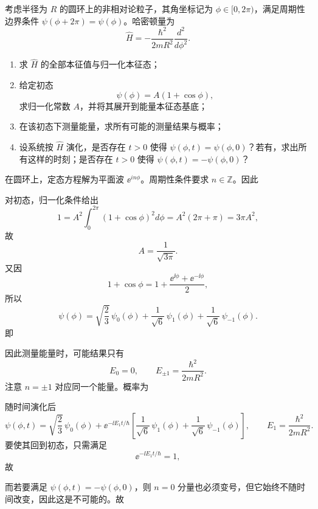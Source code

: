 ﻿

\begin{question}
考虑半径为 $R$ 的圆环上的非相对论粒子，其角坐标记为 $\phi\in[0,2\pi)$，满足周期性边界条件 $\psi(\phi+2\pi)=\psi(\phi)$。哈密顿量为
\[
\hat H=-\frac{\hbar^2}{2mR^2}\frac{d^2}{d\phi^2}.
\]

\begin{enumerate}[label=(\arabic*),leftmargin=2.5em]
  \item 求 $\hat H$ 的全部本征值与归一化本征态；
  \item 给定初态
  \[
  \psi(\phi)=A(1+\cos\phi),
  \]
  求归一化常数 $A$，并将其展开到能量本征态基底；
  \item 在该初态下测量能量，求所有可能的测量结果与概率；
  \item 设系统按 $\hat H$ 演化，是否存在 $t>0$ 使得 $\psi(\phi,t)=\psi(\phi,0)$？若有，求出所有这样的时刻；是否存在 $t>0$ 使得 $\psi(\phi,t)=-\psi(\phi,0)$？
\end{enumerate}

\begin{solution}
在圆环上，定态方程解为平面波 $\ee^{in\phi}$。周期性条件要求 $n\in\mathbb Z$。因此

对初态，归一化条件给出
\[
1=A^2\int_0^{2\pi}(1+\cos\phi)^2d\phi=A^2(2\pi+\pi)=3\pi A^2,
\]
故
\[
A=\frac{1}{\sqrt{3\pi}}.
\]
又因
\[
1+\cos\phi=1+\frac{\ee^{\ii\phi}+\ee^{-\ii\phi}}{2},
\]
所以
\[
\psi(\phi)=\sqrt{\frac{2}{3}}\,\psi_0(\phi)+\frac{1}{\sqrt6}\,\psi_1(\phi)+\frac{1}{\sqrt6}\,\psi_{-1}(\phi).
\]
即

因此测量能量时，可能结果只有
\[
E_0=0,
\qquad
E_{\pm1}=\frac{\hbar^2}{2mR^2}.
\]
注意 $n=\pm1$ 对应同一个能量。概率为

随时间演化后
\[
\psi(\phi,t)=\sqrt{\frac23}\,\psi_0(\phi)+\ee^{-\ii E_1t/\hbar}\left[\frac{1}{\sqrt6}\,\psi_1(\phi)+\frac{1}{\sqrt6}\,\psi_{-1}(\phi)\right],
\qquad E_1=\frac{\hbar^2}{2mR^2}.
\]
要使其回到初态，只需满足
\[
\ee^{-\ii E_1 t/\hbar}=1,
\]
故

而若要满足 $\psi(\phi,t)=-\psi(\phi,0)$，则 $n=0$ 分量也必须变号，但它始终不随时间改变，因此这是不可能的。故
\end{solution}
\end{question}

